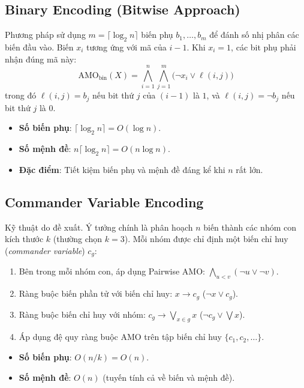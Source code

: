 \documentclass[a4paper,fleqn,nologo]{cas-sc}
\begin{document}
\subsection{Binary Encoding (Bitwise Approach)}
Phương pháp sử dụng $m=\lceil\log_2 n\rceil$ biến phụ $b_1,\dots,b_m$ để đánh số nhị phân các biến đầu vào. Biến $x_i$ tương ứng với mã của $i-1$. Khi $x_i=1$, các bit phụ phải nhận đúng mã này:
\begin{equation}
\text{AMO}_{\text{bin}}(X) = \bigwedge_{i=1}^n \bigwedge_{j=1}^m \Big( \neg x_i \lor \ell(i, j) \Big)
\end{equation}
trong đó $\ell(i, j) = b_j$ nếu bit thứ $j$ của $(i-1)$ là $1$, và $\ell(i, j) = \neg b_j$ nếu bit thứ $j$ là $0$.
\begin{itemize}
    \item \textbf{Số biến phụ}: $\lceil \log_2 n \rceil = O(\log n)$.
    \item \textbf{Số mệnh đề}: $n \lceil \log_2 n \rceil = O(n \log n)$.
    \item \textbf{Đặc điểm}: Tiết kiệm biến phụ và mệnh đề đáng kể khi $n$ rất lớn.
\end{itemize}

\subsection{Commander Variable Encoding}
Kỹ thuật do \cite{klieber2007efficient} đề xuất. Ý tưởng chính là phân hoạch $n$ biến thành các nhóm con kích thước $k$ (thường chọn $k=3$). Mỗi nhóm được chỉ định một biến chỉ huy (\textit{commander variable}) $c_g$:
\begin{enumerate}
    \item Bên trong mỗi nhóm con, áp dụng Pairwise AMO: $\bigwedge_{u < v} (\neg u \lor \neg v)$.
    \item Ràng buộc biến phần tử với biến chỉ huy: $x \to c_g$ ($\neg x \lor c_g$).
    \item Ràng buộc biến chỉ huy với nhóm: $c_g \to \bigvee_{x \in g} x$ ($\neg c_g \lor \bigvee x$).
    \item Áp dụng đệ quy ràng buộc AMO trên tập biến chỉ huy $\{c_1, c_2, \dots\}$.
\end{enumerate}
\begin{itemize}
    \item \textbf{Số biến phụ}: $O(n/k) = O(n)$.
    \item \textbf{Số mệnh đề}: $O(n)$ (tuyến tính cả về biến và mệnh đề).
\end{itemize}
\end{document}
